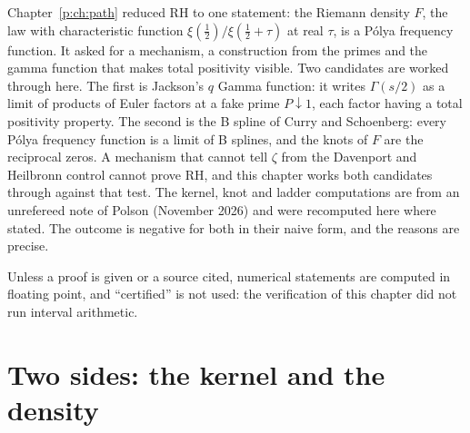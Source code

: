 \label{c:ch:cand}

Chapter~\ref{p:ch:path} reduced RH to one statement: the Riemann density $F$, the law with characteristic function $\xi(\frac12)/\xi(\frac12+\tau)$ at real $\tau$, is a P\'olya frequency function. It asked for a mechanism, a construction from the primes and the gamma function that makes total positivity visible. Two candidates are worked through here. The first is Jackson's $q$ Gamma function: it writes $\Gamma(s/2)$ as a limit of products of Euler factors at a fake prime $P\downarrow1$, each factor having a total positivity property. The second is the B spline of Curry and Schoenberg: every P\'olya frequency function is a limit of B splines, and the knots of $F$ are the reciprocal zeros. A mechanism that cannot tell $\zeta$ from the Davenport and Heilbronn control cannot prove RH, and this chapter works both candidates through against that test. The kernel, knot and ladder computations are from an unrefereed note of Polson (November 2026) and were recomputed here where stated. The outcome is negative for both in their naive form, and the reasons are precise.

Unless a proof is given or a source cited, numerical statements are computed in floating point, and ``certified'' is not used: the verification of this chapter did not run interval arithmetic.

\section{Two sides: the kernel and the density}\label{c:sec:sides}

